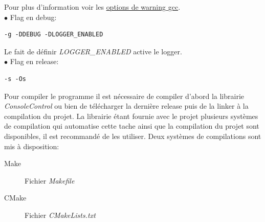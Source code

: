 \documentclass[article, backcover, french, nodocumentinfo]{upmethodology-document}
\begin{document}
				Pour plus d'information voir les \href{https://gcc.gnu.org/onlinedocs/gcc/Warning-Options.html}{options de warning gcc}.\\
				$\bullet$ Flag en debug:
				\begin{lstlisting}[breaklines=true,breakatwhitespace=true,breakindent=0pt,columns=fixed,keepspaces=true,frame=single,basicstyle=\footnotesize\sffamily]
-g -DDEBUG -DLOGGER_ENABLED\end{lstlisting}
				Le fait de définir \textit{LOGGER\_ENABLED} active le logger.\\
				$\bullet$ Flag en release:
				\begin{lstlisting}[breaklines=true,breakatwhitespace=true,breakindent=0pt,columns=fixed,keepspaces=true,frame=single,basicstyle=\footnotesize\sffamily]
-s -Os\end{lstlisting}
				Pour compiler le programme il est nécessaire de compiler d'abord la librairie \textit{ConsoleControl} ou bien de télécharger la dernière release puis de la linker à la compilation du projet. La librairie étant fournie avec le projet plusieurs systèmes de compilation qui automatise cette tache ainsi que la compilation du projet sont disponibles, il est recommandé de les utiliser.
				Deux systèmes de compilations sont mis à disposition:
				\begin{description}
					\item[Make] Fichier \textit{Makefile}
					\item[CMake] Fichier \textit{CMakeLists.txt}
				\end{description}
\end{document}

